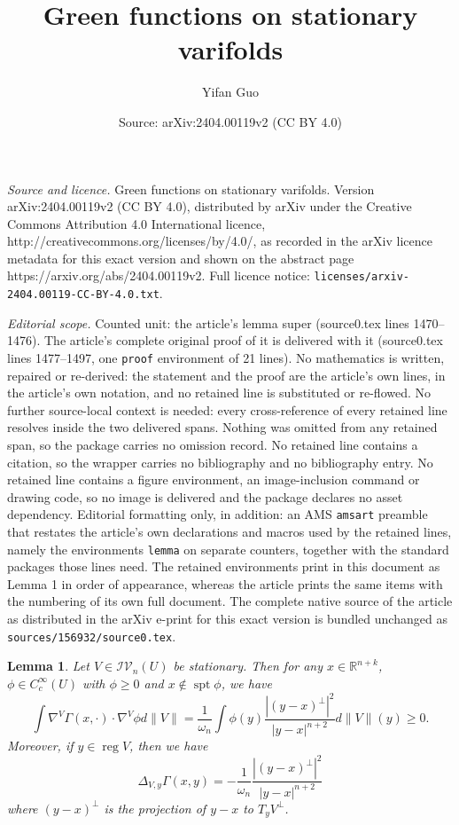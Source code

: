 \documentclass[10pt,a4paper]{amsart}
\title{Green functions on stationary varifolds}
\author{Yifan Guo}
\date{Source: arXiv:2404.00119v2 (CC BY 4.0)}
\newtheorem{lemma}{Lemma}
\newcommand{\IV}{\mathcal{IV}}
\newcommand{\R}{\mathbb{R}}
\DeclareMathOperator{\reg}{reg}
\DeclareMathOperator{\spt}{spt}
\begin{document}
\maketitle

\noindent\emph{Source and licence.} Green functions on stationary varifolds. Version arXiv:2404.00119v2 (CC BY 4.0), distributed by arXiv under the Creative Commons Attribution 4.0 International licence, http://creativecommons.org/licenses/by/4.0/, as recorded in the arXiv licence metadata for this exact version and shown on the abstract page https://arxiv.org/abs/2404.00119v2. Full licence notice: \texttt{licenses/arxiv-2404.00119-CC-BY-4.0.txt}.\par\smallskip

\noindent\textit{Editorial scope.} Counted unit: the article's lemma super (source0.tex lines 1470--1476). The article's complete original proof of it is delivered with it (source0.tex lines 1477--1497, one \texttt{proof} environment of 21 lines). No mathematics is written, repaired or re-derived: the statement and the proof are the article's own lines, in the article's own notation, and no retained line is substituted or re-flowed.  No further source-local context is needed: every cross-reference of every retained line resolves inside the two delivered spans.  Nothing was omitted from any retained span, so the package carries no omission record.  No retained line contains a citation, so the wrapper carries no bibliography and no bibliography entry.  No retained line contains a figure environment, an image-inclusion command or drawing code, so no image is delivered and the package declares no asset dependency.  Editorial formatting only, in addition: an AMS \texttt{amsart} preamble that restates the article's own declarations and macros used by the retained lines, namely the environments \texttt{lemma} on separate counters, together with the standard packages those lines need.  The retained environments print in this document as Lemma 1 in order of appearance, whereas the article prints the same items with the numbering of its own full document.  The complete native source of the article as distributed in the arXiv e-print for this exact version is bundled unchanged as \texttt{sources/156932/source0.tex}.
\begin{lemma}\label{super}
	Let $V\in \IV_n(U)$ be stationary. Then for any $x\in \R^{n+k}$, $\phi\in C_c^\infty(U)$ with $\phi\ge0$ and $x\notin \spt \phi$, we have
	\[\int \nabla^V\Gamma(x,\cdot)\cdot \nabla^V\phi d\|V\|=\frac{1}{\omega_n}\int \phi (y)\frac{|(y-x)^\perp|^2}{|y-x|^{n+2}}d\|V\|(y)\ge0. \]
	 Moreover, if $y\in\reg V$, then we have
	 \[\Delta_{V,y} \Gamma(x,y)=-\frac{1}{\omega_n}\frac{|(y-x)^\perp|^2}{|y-x|^{n+2}}\]
	where $(y-x)^{\perp}$ is the projection of $y-x$ to $T_yV^\perp$.
\end{lemma}
\end{document}
